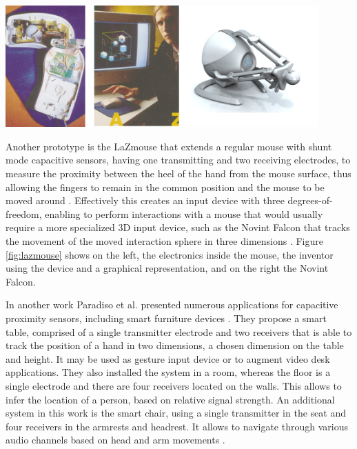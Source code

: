\begin{minipage}{\linewidth}
\centering
\includegraphics[width=0.9\textwidth]{images/lazmouse}
\label{fig:lazmouse}
\end{minipage}

Another prototype is the LaZmouse that extends a regular mouse with shunt mode capacitive sensors, having one transmitting and two receiving electrodes, to measure the proximity between the heel of the hand from the mouse surface, thus allowing the fingers to remain in the common position and the mouse to be moved around \cite{Smith1999a}. Effectively this creates an input device with three degrees-of-freedom, enabling to perform interactions with a mouse that would usually require a more specialized 3D input device, such as the Novint Falcon that tracks the movement of the moved interaction sphere in three dimensions \cite{novint2014}. Figure \ref{fig:lazmouse} shows on the left, the electronics inside the mouse, the inventor using the device and a graphical representation, and on the right the Novint Falcon.

In another work Paradiso et al. presented numerous applications for capacitive proximity sensors, including smart furniture devices \cite{ Zimmerman1995}. They propose a smart table, comprised of a single transmitter electrode and two receivers that is able to track the position of a hand in two dimensions, a chosen dimension on the table and height. It may be used as gesture input device or to augment video desk applications. They also installed the system in a room, whereas the floor is a single electrode and there are four receivers located on the walls. This allows to infer the location of a person, based on relative signal strength. An additional system in this work is the smart chair, using a single transmitter in the seat and four receivers in the armrests and headrest. It allows to navigate through various audio channels based on head and arm movements \cite{ schmandt1995audiostreamer}.

